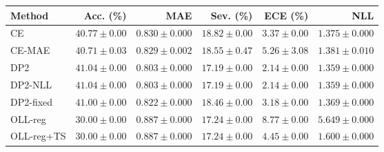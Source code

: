 \begin{tabular}{lrrrrr}
\toprule
Method & Acc. (\%) & MAE & Sev. (\%) & ECE (\%) & NLL \\
\midrule
CE & $40.77\!\pm\!0.00$ & $0.830\!\pm\!0.000$ & $18.82\!\pm\!0.00$ & $3.37\!\pm\!0.00$ & $1.375\!\pm\!0.000$ \\
CE-MAE & $40.71\!\pm\!0.03$ & $0.829\!\pm\!0.002$ & $18.55\!\pm\!0.47$ & $5.26\!\pm\!3.08$ & $1.381\!\pm\!0.010$ \\
DP2 & $41.04\!\pm\!0.00$ & $0.803\!\pm\!0.000$ & $17.19\!\pm\!0.00$ & $2.14\!\pm\!0.00$ & $1.359\!\pm\!0.000$ \\
DP2-NLL & $41.04\!\pm\!0.00$ & $0.803\!\pm\!0.000$ & $17.19\!\pm\!0.00$ & $2.14\!\pm\!0.00$ & $1.359\!\pm\!0.000$ \\
DP2-fixed & $41.00\!\pm\!0.00$ & $0.822\!\pm\!0.000$ & $18.46\!\pm\!0.00$ & $3.18\!\pm\!0.00$ & $1.369\!\pm\!0.000$ \\
OLL-reg & $30.00\!\pm\!0.00$ & $0.887\!\pm\!0.000$ & $17.24\!\pm\!0.00$ & $8.77\!\pm\!0.00$ & $5.649\!\pm\!0.000$ \\
OLL-reg+TS & $30.00\!\pm\!0.00$ & $0.887\!\pm\!0.000$ & $17.24\!\pm\!0.00$ & $4.45\!\pm\!0.00$ & $1.600\!\pm\!0.000$ \\
\bottomrule
\end{tabular}